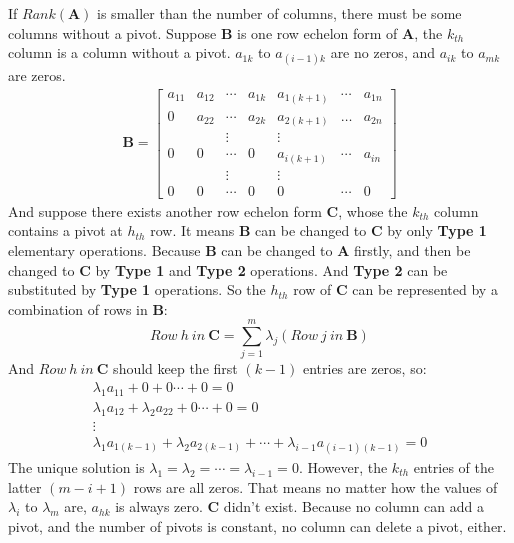 \documentclass[22pt]{article}
\begin{document}
		If $Rank(\mathbf{A})$ is smaller than the number of columns, there must be some columns without a pivot. Suppose $\mathbf{B}$ is one row echelon form of $\mathbf{A}$, the $k_{th}$ column is a column without a pivot. $a_{1k}$ to $a_{(i-1)k}$ are no zeros, and $a_{ik}$ to $a_{mk}$ are zeros.
		\begin{align}
				\mathbf{B} = 
				\left[ \begin{array}{ccccccc}
				a_{11} & a_{12} & \cdots & a_{1k} & a_{1(k+1)} & \cdots & a_{1n}\\
				0 & a_{22} & \cdots & a_{2k} & a_{2(k+1)} & \dots & a_{2n}\\	
				&& \vdots && \vdots \\	
				0 & 0 & \cdots &  0 & a_{i(k+1)} & \cdots & a_{in}\\
				&& \vdots && \vdots \\	
				0&0& \cdots &0&0& \cdots & 0
				\end{array}		\right]
		\end{align}
		And suppose there exists another row echelon form $\mathbf{C}$, whose the $k_{th}$ column contains a pivot at $h_{th}$ row. It means $\mathbf{B}$ can be changed to $\mathbf{C}$ by only \textbf{Type 1} elementary operations. Because $\mathbf{B}$ can be changed to $\mathbf{A}$ firstly, and then be changed to $\mathbf{C}$ by \textbf{Type 1} and \textbf{Type 2} operations. And \textbf{Type 2} can be substituted by \textbf{Type 1} operations. So the $h_{th}$ row of $\mathbf{C}$ can be represented by a combination of rows in $\mathbf{B}$:
		\begin{equation}
			Row\ h\ in\ \mathbf{C} = \sum\limits_{j=1}^{m} \lambda_j(Row\ j\ in\ \mathbf{B})
		\end{equation}
		And $Row\ h\ in\ \mathbf{C}$ should keep the first $(k-1)$ entries are zeros, so:
		\begin{align}
			\lambda_1a_{11}+0+0 \cdots +0=0\\
			\lambda_1a_{12} + \lambda_2a_{22}+0\cdots+0 = 0\\
			\vdots \qquad\\
			\lambda_1a_{1(k-1)} + \lambda_2a_{2(k-1)}+ \cdots + \lambda_{i-1}a_{(i-1)(k-1)} = 0
		\end{align}
		The unique solution is $\lambda_1=\lambda_2=\cdots=\lambda_{i-1}=0$. However, the $k_{th}$ entries of the latter $(m-i+1)$ rows are all zeros. That means no matter how the values of $\lambda_{i}$ to $\lambda_m$ are, $a_{hk}$ is always zero. $\mathbf{C}$ didn't exist. Because no column can add a pivot, and the number of pivots is constant, no column can delete a pivot, either.
\end{document}
